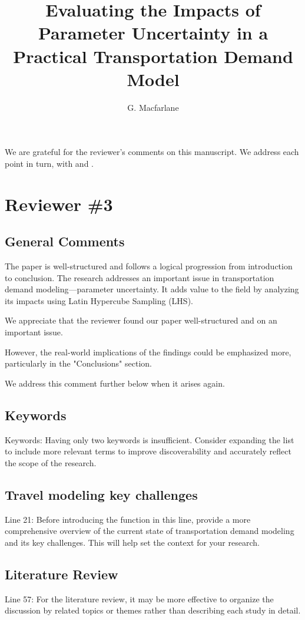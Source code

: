 \documentclass{ar2rc}
\title{Evaluating the Impacts of Parameter Uncertainty in a Practical Transportation Demand Model}
\author{G. Macfarlane}
\begin{document}
\maketitle

We are grateful for the reviewer's comments on this manuscript. We address each point in turn, with 
\DIFaddbegin {}\DIFaddend  and 
\DIFdelbegin {}\DIFdelend.

\section{Reviewer \#3}

\subsection{General Comments}
\RC The paper is well-structured and follows a logical progression from introduction to conclusion. The
research addresses an important issue in transportation demand modeling—parameter uncertainty. It
adds value to the field by analyzing its impacts using Latin Hypercube Sampling (LHS). 

\AR We appreciate that the reviewer found our paper well-structured and on an important issue.

\RC However, the real-world implications of the findings could be emphasized
more, particularly in the "Conclusions" section.

\AR We address this comment further below when it arises again.

\subsection{Keywords}
\RC Keywords: Having only two keywords is insufficient. Consider expanding the list to include
more relevant terms to improve discoverability and accurately reflect the scope of the
research.

\subsection{Travel modeling key challenges}
\RC Line 21: Before introducing the function in this line, provide a more comprehensive overview of
the current state of transportation demand modeling and its key challenges. This will help set
the context for your research.

\subsection{Literature Review}
\RC Line 57: For the literature review, it may be more effective to organize the discussion by related
topics or themes rather than describing each study in detail.
\end{document}
